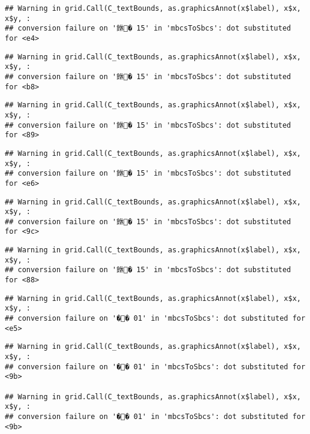 \documentclass[]{article}
\begin{document}
\begin{verbatim}
## Warning in grid.Call(C_textBounds, as.graphicsAnnot(x$label), x$x, x$y, :
## conversion failure on '銝� 15' in 'mbcsToSbcs': dot substituted for <e4>
\end{verbatim}

\begin{verbatim}
## Warning in grid.Call(C_textBounds, as.graphicsAnnot(x$label), x$x, x$y, :
## conversion failure on '銝� 15' in 'mbcsToSbcs': dot substituted for <b8>
\end{verbatim}

\begin{verbatim}
## Warning in grid.Call(C_textBounds, as.graphicsAnnot(x$label), x$x, x$y, :
## conversion failure on '銝� 15' in 'mbcsToSbcs': dot substituted for <89>
\end{verbatim}

\begin{verbatim}
## Warning in grid.Call(C_textBounds, as.graphicsAnnot(x$label), x$x, x$y, :
## conversion failure on '銝� 15' in 'mbcsToSbcs': dot substituted for <e6>
\end{verbatim}

\begin{verbatim}
## Warning in grid.Call(C_textBounds, as.graphicsAnnot(x$label), x$x, x$y, :
## conversion failure on '銝� 15' in 'mbcsToSbcs': dot substituted for <9c>
\end{verbatim}

\begin{verbatim}
## Warning in grid.Call(C_textBounds, as.graphicsAnnot(x$label), x$x, x$y, :
## conversion failure on '銝� 15' in 'mbcsToSbcs': dot substituted for <88>
\end{verbatim}

\begin{verbatim}
## Warning in grid.Call(C_textBounds, as.graphicsAnnot(x$label), x$x, x$y, :
## conversion failure on '�� 01' in 'mbcsToSbcs': dot substituted for <e5>
\end{verbatim}

\begin{verbatim}
## Warning in grid.Call(C_textBounds, as.graphicsAnnot(x$label), x$x, x$y, :
## conversion failure on '�� 01' in 'mbcsToSbcs': dot substituted for <9b>

## Warning in grid.Call(C_textBounds, as.graphicsAnnot(x$label), x$x, x$y, :
## conversion failure on '�� 01' in 'mbcsToSbcs': dot substituted for <9b>
\end{verbatim}
\end{document}
